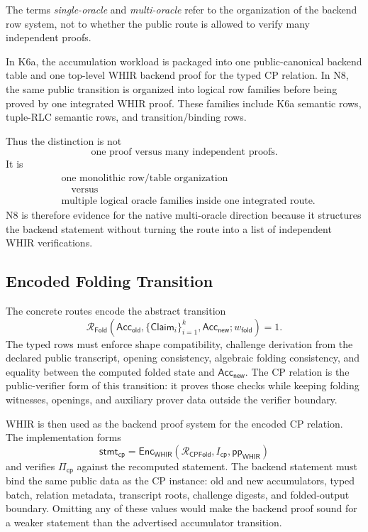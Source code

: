 \documentclass[11pt]{article}
\theoremstyle{definition}
\newcommand{\WHIR}{\mathsf{WHIR}}
\newcommand{\Acc}{\mathsf{Acc}}
\newcommand{\Rfold}{\mathcal{R}_{\mathsf{Fold}}}
\newcommand{\Rcp}{\mathcal{R}_{\mathsf{CPFold}}}
\begin{document}
The terms \emph{single-oracle} and \emph{multi-oracle} refer to the organization
of the backend row system, not to whether the public route is allowed to verify
many independent proofs.

In K6a, the accumulation workload is packaged into one public-canonical backend
table and one top-level WHIR backend proof for the typed CP relation. In N8, the
same public transition is organized into logical row families before being
proved by one integrated WHIR proof. These families include K6a semantic rows,
tuple-RLC semantic rows, and transition/binding rows.

Thus the distinction is not
\[
  \text{one proof versus many independent proofs}.
\]
It is
\[
  \begin{aligned}
    &\text{one monolithic row/table organization}
    \\
    &\quad\text{versus}
    \\
    &\text{multiple logical oracle families inside one integrated route}.
  \end{aligned}
\]
N8 is therefore evidence for the native multi-oracle direction because it
structures the backend statement without turning the route into a list of
independent WHIR verifications.

\subsection{Encoded Folding Transition}
\label{sec:encoded-folding-transition}

The concrete routes encode the abstract transition
\[
  \Rfold\!\left(
    \Acc_{\mathsf{old}},
    \{\mathsf{Claim}_i\}_{i=1}^k,
    \Acc_{\mathsf{new}};
    w_{\mathsf{fold}}
  \right)=1.
\]
The typed rows must enforce shape compatibility, challenge derivation from the
declared public transcript, opening consistency, algebraic folding consistency,
and equality between the computed folded state and
\(\Acc_{\mathsf{new}}\). The CP relation is the public-verifier form of this
transition: it proves those checks while keeping folding witnesses, openings,
and auxiliary prover data outside the verifier boundary.

WHIR is then used as the backend proof system for the encoded CP relation. The
implementation forms
\[
  \mathsf{stmt}_{\mathsf{cp}}
  =
  \mathsf{Enc}_{\WHIR}(\Rcp,I_{\mathsf{cp}},\mathsf{pp}_{\WHIR})
\]
and verifies \(\Pi_{\mathsf{cp}}\) against the recomputed statement. The backend
statement must bind the same public data as the CP instance: old and new
accumulators, typed batch, relation metadata, transcript roots, challenge
digests, and folded-output boundary. Omitting any of these values would make the
backend proof sound for a weaker statement than the advertised accumulator
transition.
\end{document}
